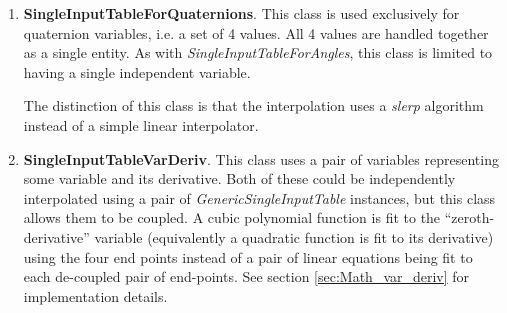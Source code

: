 \documentclass[11pt,fleqn]{report}
\begin{document}
\begin{enumerate}
\begin{enumerate}
    In general, the architecture developed here could be used for any other
    cyclic variable with a period other than $2\pi$ or 360 degrees.  The value
    \textit{half\_circle} describes the mid-point; for the
    \textit{SingleInputTableForAngles} class it has a
    value of either $\pi$ or $180$, but could be assigned some other value
    by extension of the class.

   \item \textbf{SingleInputTableForQuaternions}.  This class is used
    exclusively for quaternion variables, i.e. a set of 4 values.  All 4
    values are handled together as a single entity.  As with
    \textit{SingleInputTableForAngles}, this class is limited to having a
    single independent variable.

    The distinction of this class is that the interpolation uses a
    \textit{slerp} algorithm instead of a simple linear interpolator.

  \item \textbf{SingleInputTableVarDeriv}. This class uses a pair of variables
  representing some variable and its derivative. Both of these could be
  independently interpolated using a pair of \textit{GenericSingleInputTable}
  instances, but this class allows them to be coupled. A cubic polynomial
  function is
  fit to the ``zeroth-derivative'' variable (equivalently a quadratic function
  is fit to its derivative) using the four end points instead of a pair of
  linear equations being fit to each de-coupled pair of end-points.
  See section \ref{sec:Math_var_deriv} for implementation details.
  \end{enumerate}
  \end{enumerate}
\end{document}
